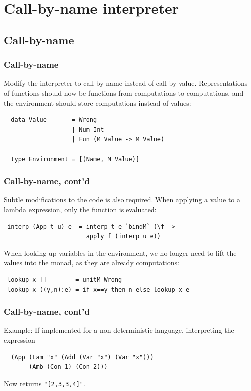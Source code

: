 \documentclass{beamer}
\begin{document}
\section{Call-by-name interpreter}
\subsection{Call-by-name}
\begin{frame}[fragile]
 \frametitle{Call-by-name}
 Modify the interpreter to call-by-name instead of call-by-value.
 Representations of functions should now be functions from computations to
 computations, and the environment should store computations instead of values:
 \begin{lstlisting}
  data Value       = Wrong
                   | Num Int
                   | Fun (M Value -> M Value)

  type Environment = [(Name, M Value)]
 \end{lstlisting}
\end{frame}

\begin{frame}[fragile]
 \frametitle{Call-by-name, cont'd}
 Subtle modifications to the code is also required. When applying a value to a
 lambda expression, only the function is evaluated:
 \begin{lstlisting}
 interp (App t u) e  = interp t e `bindM` (\f ->
                       apply f (interp u e))
 \end{lstlisting}

 When looking up variables in the environment, we no longer need to lift the
 values into the monad, as they are already computations:
 \begin{lstlisting}
 lookup x []        = unitM Wrong
 lookup x ((y,n):e) = if x==y then n else lookup x e
 \end{lstlisting}
\end{frame}

\begin{frame}[fragile]
 \frametitle{Call-by-name, cont'd}
 Example: If implemented for a non-deterministic language, interpreting the
 expression
 \begin{lstlisting}
  (App (Lam "x" (Add (Var "x") (Var "x")))
       (Amb (Con 1) (Con 2)))
 \end{lstlisting}

 Now returns \texttt{"[2,3,3,4]"}.
\end{frame}
\end{document}
